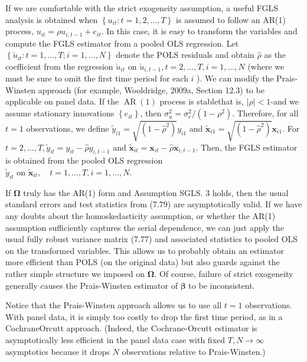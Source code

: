 \documentclass[10pt]{article}
\begin{document}
If we are comfortable with the strict exogeneity assumption, a useful FGLS analysis is obtained when $\left\{u_{i t}: t=1,2, \ldots, T\right\}$ is assumed to follow an AR(1) process, $u_{i t}=\rho u_{i, t-1}+e_{i t}$. In this case, it is easy to transform the variables and compute the FGLS estimator from a pooled OLS regression. Let $\left\{\check{u}_{i t}: t=1, \ldots, T ; i=1, \ldots, N\right\}$ denote the POLS residuals and obtain $\hat{\rho}$ as the coefficient from the regression $\check{u}_{i t}$ on $\check{u}_{i, t-1}, t=2, \ldots, T, i=1, \ldots, N$ (where we must be sure to omit the first time period for each $i$ ). We can modify the Prais-Winsten approach (for example, Wooldridge, 2009a, Section 12.3) to be applicable on panel data. If the $\operatorname{AR}(1)$ process is stablethat is, $|\rho|<1$-and we assume stationary innovations $\left\{e_{i t}\right\}$, then $\sigma_{u}^{2}=\sigma_{e}^{2} /\left(1-\rho^{2}\right)$. Therefore, for all $t=1$ observations, we define $\tilde{y}_{i 1}=\sqrt{\left(1-\hat{\rho}^{2}\right)} y_{i 1}$ and $\tilde{\mathbf{x}}_{i 1}= \sqrt{\left(1-\hat{\rho}^{2}\right)} \mathbf{x}_{i 1}$. For $t=2, \ldots, T, \tilde{y}_{i t}=y_{i t}-\hat{\rho} y_{i, t-1}$ and $\tilde{\mathbf{x}}_{i t}=\mathbf{x}_{i t}-\hat{\rho} \mathbf{x}_{i, t-1}$. Then, the FGLS estimator is obtained from the pooled OLS regression\\
$\tilde{y}_{i t}$ on $\tilde{\mathbf{x}}_{i t}, \quad t=1, \ldots, T, i=1, \ldots, N$.

If $\boldsymbol{\Omega}$ truly has the AR(1) form and Assumption SGLS. 3 holds, then the usual standard errors and test statistics from (7.79) are asymptotically valid. If we have any doubts about the homoskedasticity assumption, or whether the AR(1) assumption sufficiently captures the serial dependence, we can just apply the usual fully robust variance matrix (7.77) and associated statistics to pooled OLS on the transformed variables. This allows us to probably obtain an estimator more efficient than POLS (on the original data) but also guards against the rather simple structure we imposed on $\boldsymbol{\Omega}$. Of course, failure of strict exogeneity generally causes the Prais-Winsten estimator of $\boldsymbol{\beta}$ to be inconsistent.

Notice that the Prais-Winsten approach allows us to use all $t=1$ observations. With panel data, it is simply too costly to drop the first time period, as in a CochraneOrcutt approach. (Indeed, the Cochrane-Orcutt estimator is asymptotically less efficient in the panel data case with fixed $T, N \rightarrow \infty$ asymptotics because it drops $N$ observations relative to Prais-Winsten.)
\end{document}
